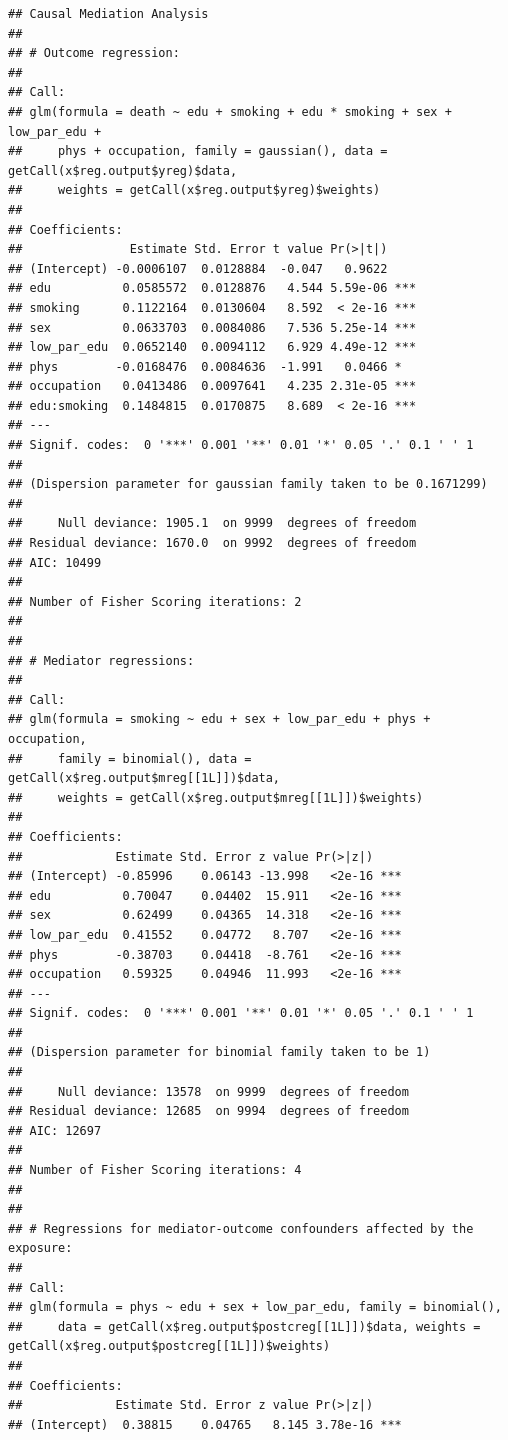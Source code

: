 \documentclass[
]{book}
\begin{document}
\begin{verbatim}
## Causal Mediation Analysis
## 
## # Outcome regression:
## 
## Call:
## glm(formula = death ~ edu + smoking + edu * smoking + sex + low_par_edu + 
##     phys + occupation, family = gaussian(), data = getCall(x$reg.output$yreg)$data, 
##     weights = getCall(x$reg.output$yreg)$weights)
## 
## Coefficients:
##               Estimate Std. Error t value Pr(>|t|)    
## (Intercept) -0.0006107  0.0128884  -0.047   0.9622    
## edu          0.0585572  0.0128876   4.544 5.59e-06 ***
## smoking      0.1122164  0.0130604   8.592  < 2e-16 ***
## sex          0.0633703  0.0084086   7.536 5.25e-14 ***
## low_par_edu  0.0652140  0.0094112   6.929 4.49e-12 ***
## phys        -0.0168476  0.0084636  -1.991   0.0466 *  
## occupation   0.0413486  0.0097641   4.235 2.31e-05 ***
## edu:smoking  0.1484815  0.0170875   8.689  < 2e-16 ***
## ---
## Signif. codes:  0 '***' 0.001 '**' 0.01 '*' 0.05 '.' 0.1 ' ' 1
## 
## (Dispersion parameter for gaussian family taken to be 0.1671299)
## 
##     Null deviance: 1905.1  on 9999  degrees of freedom
## Residual deviance: 1670.0  on 9992  degrees of freedom
## AIC: 10499
## 
## Number of Fisher Scoring iterations: 2
## 
## 
## # Mediator regressions: 
## 
## Call:
## glm(formula = smoking ~ edu + sex + low_par_edu + phys + occupation, 
##     family = binomial(), data = getCall(x$reg.output$mreg[[1L]])$data, 
##     weights = getCall(x$reg.output$mreg[[1L]])$weights)
## 
## Coefficients:
##             Estimate Std. Error z value Pr(>|z|)    
## (Intercept) -0.85996    0.06143 -13.998   <2e-16 ***
## edu          0.70047    0.04402  15.911   <2e-16 ***
## sex          0.62499    0.04365  14.318   <2e-16 ***
## low_par_edu  0.41552    0.04772   8.707   <2e-16 ***
## phys        -0.38703    0.04418  -8.761   <2e-16 ***
## occupation   0.59325    0.04946  11.993   <2e-16 ***
## ---
## Signif. codes:  0 '***' 0.001 '**' 0.01 '*' 0.05 '.' 0.1 ' ' 1
## 
## (Dispersion parameter for binomial family taken to be 1)
## 
##     Null deviance: 13578  on 9999  degrees of freedom
## Residual deviance: 12685  on 9994  degrees of freedom
## AIC: 12697
## 
## Number of Fisher Scoring iterations: 4
## 
## 
## # Regressions for mediator-outcome confounders affected by the exposure: 
## 
## Call:
## glm(formula = phys ~ edu + sex + low_par_edu, family = binomial(), 
##     data = getCall(x$reg.output$postcreg[[1L]])$data, weights = getCall(x$reg.output$postcreg[[1L]])$weights)
## 
## Coefficients:
##             Estimate Std. Error z value Pr(>|z|)    
## (Intercept)  0.38815    0.04765   8.145 3.78e-16 ***

\end{verbatim}
\end{document}
